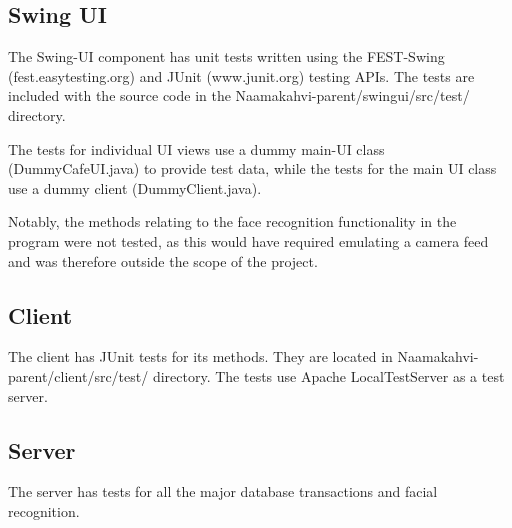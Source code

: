 \documentclass[11pt]{article}
\begin{document}
\subsection{Swing UI}
The Swing-UI component has unit tests written using the FEST-Swing (fest.easytesting.org)
and JUnit (www.junit.org) testing APIs. The tests are included with the source code in the
Naamakahvi-parent/swingui/src/test/ directory. 

The tests for individual UI views use a dummy main-UI class (DummyCafeUI.java) to provide
test data, while the tests for the main UI class use a dummy client (DummyClient.java).

Notably, the methods relating to the face recognition functionality in the program were
not tested, as this would have required emulating a camera feed and was therefore outside
the scope of the project.

\subsection{Client}
The client has JUnit tests for its methods. They are located in Naamakahvi-parent/client/src/test/
directory. The tests use Apache LocalTestServer as a test server.

\subsection{Server}
The server has tests for all the major database transactions and facial recognition.
\end{document}
